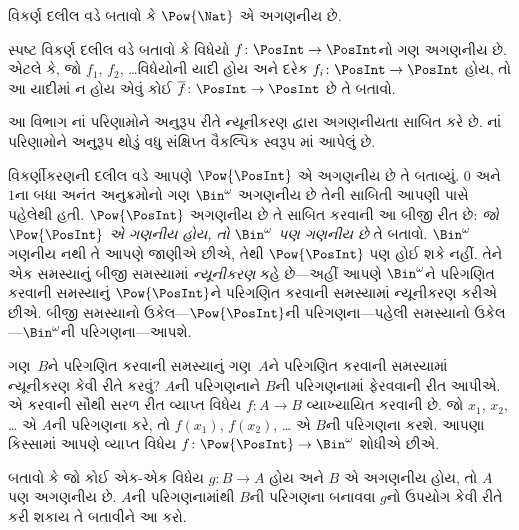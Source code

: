 \begin{prob}
વિકર્ણ દલીલ વડે બતાવો કે $\Pow{\Nat}$ એ અગણનીય છે.
\end{prob}

\begin{prob}\label{sfr:siz:nen:prob:f-posint}
સ્પષ્ટ વિકર્ણ દલીલ વડે બતાવો કે વિધેયો
$f \colon \PosInt \to \PosInt$નો ગણ અગણનીય છે.
એટલે કે, જો $f_1$, $f_2$, \dots વિધેયોની યાદી હોય અને દરેક
$f_i\colon \PosInt \to \PosInt$ હોય, તો આ યાદીમાં ન હોય એવું
કોઈ $\overline{f}\colon \PosInt \to \PosInt$ છે તે બતાવો.
\end{prob}
\endgroup


\begingroup
\makeatletter{}\makeatother


\label{guunit:OLP-0034}


\begin{editorial}
  આ વિભાગ નાં પરિણામોને અનુરૂપ રીતે
  ન્યૂનીકરણ દ્વારા અગણનીયતા સાબિત કરે છે. નાં
  પરિણામોને અનુરૂપ થોડું વધુ સંક્ષિપ્ત વૈકલ્પિક સ્વરૂપ
  માં આપેલું છે.
\end{editorial}

વિકર્ણીકરણની દલીલ વડે આપણે $\Pow{\PosInt}$ એ અગણનીય
છે તે બતાવ્યું. $0$ અને $1$ના બધા અનંત અનુક્રમોનો ગણ
$\Bin^\omega$ અગણનીય છે તેની સાબિતી આપણી પાસે
પહેલેથી હતી. $\Pow{\PosInt}$ અગણનીય છે તે સાબિત કરવાની
આ બીજી રીત છે: \emph{જો $\Pow{\PosInt}$ એ ગણનીય હોય, તો
$\Bin^\omega$ પણ ગણનીય છે} તે બતાવો. $\Bin^\omega$
ગણનીય નથી તે આપણે જાણીએ છીએ, તેથી $\Pow{\PosInt}$ પણ
હોઈ શકે નહીં. તેને એક સમસ્યાનું બીજી સમસ્યામાં \emph{ન્યૂનીકરણ}
કહે છે---અહીં આપણે $\Bin^\omega$ને પરિગણિત કરવાની સમસ્યાનું
$\Pow{\PosInt}$ને પરિગણિત કરવાની સમસ્યામાં ન્યૂનીકરણ કરીએ છીએ.
બીજી સમસ્યાનો ઉકેલ---$\Pow{\PosInt}$ની પરિગણના---પહેલી સમસ્યાનો
ઉકેલ---$\Bin^\omega$ની પરિગણના---આપશે.

ગણ~$B$ને પરિગણિત કરવાની સમસ્યાનું ગણ~$A$ને પરિગણિત કરવાની
સમસ્યામાં ન્યૂનીકરણ કેવી રીતે કરવું? $A$ની પરિગણનાને $B$ની
પરિગણનામાં ફેરવવાની રીત આપીએ. એ કરવાની સૌથી સરળ રીત
વ્યાપ્ત વિધેય $f\colon A \to B$ વ્યાખ્યાયિત કરવાની છે.
જો $x_1$, $x_2$, \dots{} એ $A$ની પરિગણના કરે, તો
$f(x_1)$, $f(x_2)$, \dots{} એ $B$ની પરિગણના કરશે.
આપણા કિસ્સામાં આપણે વ્યાપ્ત વિધેય
$f\colon \Pow{\PosInt} \to \Bin^\omega$ શોધીએ છીએ.

\begin{prob}
બતાવો કે જો કોઈ એક-એક વિધેય $g\colon B \to A$ હોય અને
$B$ એ અગણનીય હોય, તો $A$ પણ અગણનીય છે.
$A$ની પરિગણનામાંથી $B$ની પરિગણના બનાવવા $g$નો ઉપયોગ કેવી રીતે
કરી શકાય તે બતાવીને આ કરો.
\end{prob}

